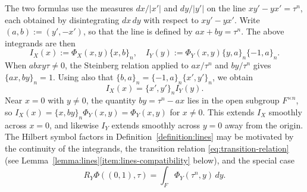 \documentclass[reqno]{amsart}
\theoremstyle{plain}
\theoremstyle{definition}
\theoremstyle{itplain}
\numberwithin{equation}{section}
\numberwithin{theorem}{section}
\begin{document}
The two formulas use the measures $d x / \lvert x' \rvert$ and $d y / \lvert y' \rvert$ on the line $x y' - y x' = \tau^n$, each obtained by disintegrating $d x \, d y$ with respect to $x y' - y x'$.  Write $(a, b) := (y', -x')$, so that the line is defined by $a x + b y = \tau^n$.  The above integrands are then
\begin{equation*}
  I_X(x) := \Phi_X \left( x, y \right) \{x, b\}_n,
  \quad I_Y(y) := \Phi_Y(x, y) \{y, a\}_n \{- 1, a\}_n.
\end{equation*}
When $a b x y \tau \neq 0$, the Steinberg relation applied to $a x / \tau^n$ and $b y / \tau^n$ gives $\{a x, b y\}_n = 1$.  Using also that $\{b, a\}_n = \{- 1, a\}_n \{x', y'\}_n$, we obtain
\begin{equation}\label{eq:symbol-on-lines}
  I_X(x) = \{x', y'\}_n I_Y(y).
\end{equation}
Near $x = 0$ with $y \neq 0$, the quantity $b y = \tau^n - a x$ lies in the open subgroup $F^{\times n}$, so $I_X(x) = \{x, b y\}_n \Phi_Y(x, y) = \Phi_Y(x, y)$ for $x \neq 0$.  This extends $I_X$ smoothly across $x = 0$, and likewise $I_Y$ extends smoothly across $y = 0$ away from the origin.  The Hilbert symbol factors in Definition~\ref{definition:lines} may be motivated by the continuity of the integrands, the transition relation \eqref{eq:transition-relation} (see Lemma~\ref{lemma:lines}\eqref{item:lines-compatibility} below), and the special case
\begin{equation*}
  R_Y \Phi((0, 1), \tau) = \int_{F} \Phi_Y(\tau^n, y) \, d y.
\end{equation*}
\end{document}
